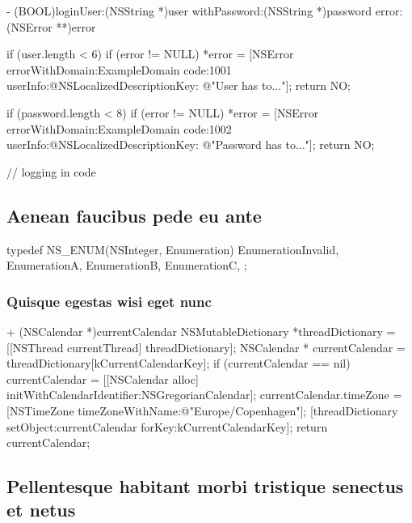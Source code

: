 \documentclass[10pt]{extarticle}
\begin{document}
\begin{objclisting}
- (BOOL)loginUser:(NSString *)user withPassword:(NSString *)password error:(NSError **)error
{
    if (user.length < 6) {
        if (error != NULL)
            *error = [NSError errorWithDomain:ExampleDomain
                                         code:1001
                                     userInfo:@{NSLocalizedDescriptionKey: @"User has to..."}];
        return NO;
    }
   
    if (password.length < 8)
        if (error != NULL)
            *error = [NSError errorWithDomain:ExampleDomain
                                         code:1002
                                     userInfo:@{NSLocalizedDescriptionKey: @"Password has to..."}];
        return NO;
   
    // logging in code
}
\end{objclisting}

\subsection{Aenean faucibus pede eu ante}

\begin{objclisting}
typedef NS_ENUM(NSInteger, Enumeration) {
    EnumerationInvalid,
    EnumerationA,
    EnumerationB,
    EnumerationC,
};
\end{objclisting}

\subsubsection{Quisque egestas wisi eget nunc}

\begin{objclisting}
+ (NSCalendar *)currentCalendar
{
    NSMutableDictionary *threadDictionary = [[NSThread currentThread] threadDictionary];
    NSCalendar * currentCalendar = threadDictionary[kCurrentCalendarKey];
    if (currentCalendar == nil) {
        currentCalendar = [[NSCalendar alloc] initWithCalendarIdentifier:NSGregorianCalendar];
        currentCalendar.timeZone = [NSTimeZone timeZoneWithName:@"Europe/Copenhagen"];
        [threadDictionary setObject:currentCalendar forKey:kCurrentCalendarKey];
    }
    return currentCalendar;
}
\end{objclisting}

\subsection{Pellentesque habitant morbi tristique senectus et netus}
\end{document}
